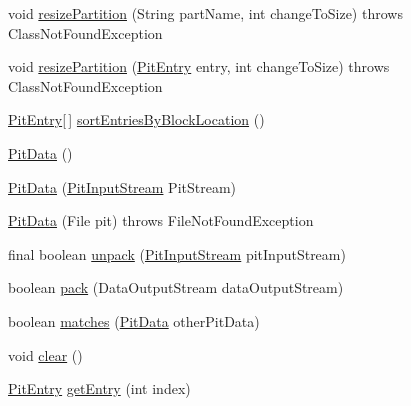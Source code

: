 \begin{DoxyCompactItemize}
\item 
void \hyperlink{class_c_a_s_u_a_l_1_1archiving_1_1libpit_1_1_pit_data_ad9bf38702c94c0e25ea1e2175a14e8c8}{resize\-Partition} (String part\-Name, int change\-To\-Size)  throws Class\-Not\-Found\-Exception 
\item 
void \hyperlink{class_c_a_s_u_a_l_1_1archiving_1_1libpit_1_1_pit_data_ac5958719c4de4485093dd5d7a6ca1c65}{resize\-Partition} (\hyperlink{class_c_a_s_u_a_l_1_1archiving_1_1libpit_1_1_pit_entry}{Pit\-Entry} entry, int change\-To\-Size)  throws Class\-Not\-Found\-Exception 
\item 
\hyperlink{class_c_a_s_u_a_l_1_1archiving_1_1libpit_1_1_pit_entry}{Pit\-Entry}\mbox{[}$\,$\mbox{]} \hyperlink{class_c_a_s_u_a_l_1_1archiving_1_1libpit_1_1_pit_data_aad4e04c99c61973ec42a1737dd6f156a}{sort\-Entries\-By\-Block\-Location} ()
\item 
\hyperlink{class_c_a_s_u_a_l_1_1archiving_1_1libpit_1_1_pit_data_a575807b0b55555f13263cb9e11b0e8f0}{Pit\-Data} ()
\item 
\hyperlink{class_c_a_s_u_a_l_1_1archiving_1_1libpit_1_1_pit_data_a5b8cfb6f9c2f8f3c70f35bfe464ef3d2}{Pit\-Data} (\hyperlink{class_c_a_s_u_a_l_1_1archiving_1_1libpit_1_1_pit_input_stream}{Pit\-Input\-Stream} Pit\-Stream)
\item 
\hyperlink{class_c_a_s_u_a_l_1_1archiving_1_1libpit_1_1_pit_data_a9e4e20dbeacb01785f44e8e17bc38dee}{Pit\-Data} (File pit)  throws File\-Not\-Found\-Exception 
\item 
final boolean \hyperlink{class_c_a_s_u_a_l_1_1archiving_1_1libpit_1_1_pit_data_a5c3639c6e3b5d9a75f105abccb033e20}{unpack} (\hyperlink{class_c_a_s_u_a_l_1_1archiving_1_1libpit_1_1_pit_input_stream}{Pit\-Input\-Stream} pit\-Input\-Stream)
\item 
boolean \hyperlink{class_c_a_s_u_a_l_1_1archiving_1_1libpit_1_1_pit_data_ae1127a2be4d3e84705e23fcc8272d406}{pack} (Data\-Output\-Stream data\-Output\-Stream)
\item 
boolean \hyperlink{class_c_a_s_u_a_l_1_1archiving_1_1libpit_1_1_pit_data_ae1ee835acd4523c6e6d2d87d77dce53c}{matches} (\hyperlink{class_c_a_s_u_a_l_1_1archiving_1_1libpit_1_1_pit_data}{Pit\-Data} other\-Pit\-Data)
\item 
void \hyperlink{class_c_a_s_u_a_l_1_1archiving_1_1libpit_1_1_pit_data_a25d720cdeb7e6b50f2816d1fd4af4784}{clear} ()
\item 
\hyperlink{class_c_a_s_u_a_l_1_1archiving_1_1libpit_1_1_pit_entry}{Pit\-Entry} \hyperlink{class_c_a_s_u_a_l_1_1archiving_1_1libpit_1_1_pit_data_a74e2d83ff8b0a83e36bebbf96891c37c}{get\-Entry} (int index)

\end{DoxyCompactItemize}
